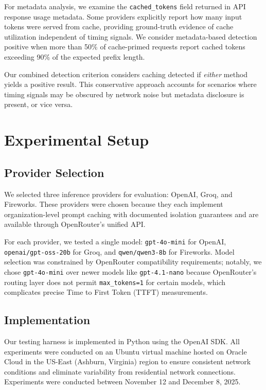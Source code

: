 \documentclass[conference]{IEEEtran}
\begin{document}
For metadata analysis, we examine the \texttt{cached\_tokens} field returned in API response usage metadata.
Some providers explicitly report how many input tokens were served from cache, providing ground-truth evidence of cache utilization independent of timing signals.
We consider metadata-based detection positive when more than 50\% of cache-primed requests report cached tokens exceeding 90\% of the expected prefix length.

Our combined detection criterion considers caching detected if \textit{either} method yields a positive result.
This conservative approach accounts for scenarios where timing signals may be obscured by network noise but metadata disclosure is present, or vice versa.

\section{Experimental Setup}
\label{sec:setup}

\subsection{Provider Selection}

We selected three inference providers for evaluation: OpenAI, Groq, and Fireworks.
These providers were chosen because they each implement organization-level prompt caching with documented isolation guarantees and are available through OpenRouter's unified API.

For each provider, we tested a single model: \texttt{gpt-4o-mini} for OpenAI, \texttt{openai/gpt-oss-20b} for Groq, and \texttt{qwen/qwen3-8b} for Fireworks.
Model selection was constrained by OpenRouter compatibility requirements; notably, we chose \texttt{gpt-4o-mini} over newer models like \texttt{gpt-4.1-nano} because OpenRouter's routing layer does not permit \texttt{max\_tokens=1} for certain models, which complicates precise Time to First Token (TTFT) measurements.

\subsection{Implementation}

Our testing harness is implemented in Python using the OpenAI SDK.
All experiments were conducted on an Ubuntu virtual machine hosted on Oracle Cloud in the US-East (Ashburn, Virginia) region to ensure consistent network conditions and eliminate variability from residential network connections.
Experiments were conducted between November 12 and December 8, 2025.
\end{document}
